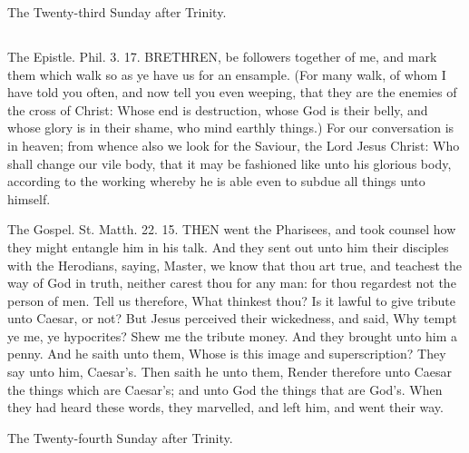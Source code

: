 The Twenty-third Sunday after Trinity.
\subsection{}

The Epistle. Phil. 3. 17.
BRETHREN, be followers together of me, and mark them which walk so as ye have us for an ensample. (For many walk, of whom I have told you often, and now tell you even weeping, that they are the enemies of the cross of Christ: Whose end is destruction, whose God is their belly, and whose glory is in their shame, who mind earthly things.) For our conversation is in heaven; from whence also we look for the Saviour, the Lord Jesus Christ: Who shall change our vile body, that it may be fashioned like unto his glorious body, according to the working whereby he is able even to subdue all things unto himself.


The Gospel. St. Matth. 22. 15.
THEN went the Pharisees, and took counsel how they might entangle him in his talk. And they sent out unto him their disciples with the Herodians, saying, Master, we know that thou art true, and teachest the way of God in truth, neither carest thou for any man: for thou regardest not the person of men. Tell us therefore, What thinkest thou? Is it lawful to give tribute unto Caesar, or not? But Jesus perceived their wickedness, and said, Why tempt ye me, ye hypocrites? Shew me the tribute money. And they brought unto him a penny. And he saith unto them, Whose is this image and superscription? They say unto him, Caesar's. Then saith he unto them, Render therefore unto Caesar the things which are Caesar's; and unto God the things that are God's. When they had heard these words, they marvelled, and left him, and went their way.


The Twenty-fourth Sunday after Trinity.
\subsection{}


